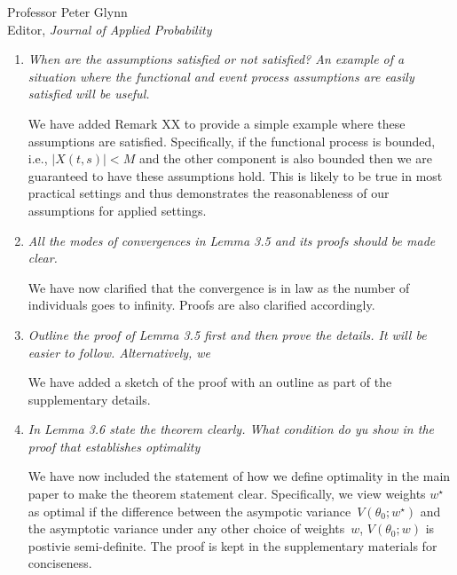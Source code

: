 \documentclass[11pt]{letter} %
\begin{document}
\begin{letter}{Professor
	Peter Glynn\\
	Editor, {\em Journal of Applied Probability}}
\begin{enumerate}
\vspace{5mm}
That is correct, we have fixed this issue.
\vspace{5mm}

\item {\it When are the assumptions satisfied or not satisfied? An example of a
situation where the functional and event process assumptions are easily satisfied will be useful.}

\vspace{5mm}
We have added Remark XX to provide a simple example where these assumptions are satisfied.  Specifically, if the functional process is bounded, i.e., $|X(t,s)| < M$ and the other component is also bounded then we are guaranteed to have these assumptions hold.  This is likely to be true in most practical settings and thus demonstrates the reasonableness of our assumptions for applied settings.
\vspace{5mm}

\item {\it All the modes of convergences in Lemma 3.5 and its proofs should be made clear.}

\vspace{5mm}
We have now clarified that the convergence is in law as the number of individuals goes to infinity.  Proofs are also clarified accordingly.
\vspace{5mm}

\item {\it Outline the proof of Lemma 3.5 first and then prove the details.  It will be easier to follow.  Alternatively, we }

\vspace{5mm}
We have added a sketch of the proof with an outline as part of the supplementary details.
\vspace{5mm}

\item {\it In Lemma 3.6 state the theorem clearly.  What condition do yu show in the proof that establishes optimality}

\vspace{5mm}
We have now included the statement of how we define optimality in the main paper to make the theorem statement clear.  Specifically, we view weights $w^\star$ as optimal if the difference between the asympotic variance~$V (\theta_0; w^\star)$ and the asymptotic variance under any other choice of weights~$w$, $V(\theta_0; w)$ is postivie semi-definite. The proof is kept in the supplementary materials for conciseness.
\vspace{5mm}


\end{enumerate}
\end{letter}
\end{document}
